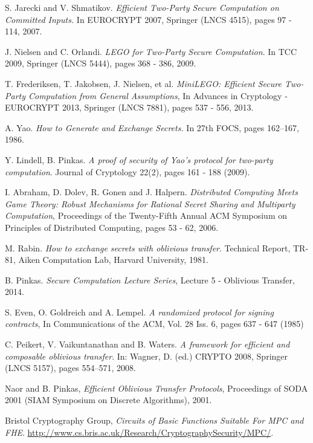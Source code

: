 \documentclass[ %
                    author={Nicholas Tutte},
                supervisor={Prof. Nigel Smart},
                    degree={MEng},
                     title={Secure Two Party Computation},
                  subtitle={A practical comparison of recent protocols},
                      type={Research - GG1K},
                      year={2015} ]{dissertation}
\begin{document}
\begin{thebibliography}{99}
			S. Jarecki and V. Shmatikov.
			\emph{Efficient Two-Party Secure Computation on Committed Inputs.}
			In EUROCRYPT 2007, Springer (LNCS 4515),
			pages 97 - 114,
			2007.

			J. Nielsen and C. Orlandi. \emph{LEGO for Two-Party Secure Computation}. In TCC 2009, Springer (LNCS 5444), pages 368 - 386, 2009.

			T. Frederiksen, T. Jakobsen, J. Nielsen, et al. \emph{MiniLEGO: Efficient Secure Two-Party Computation from General Assumptions}, In Advances in Cryptology - EUROCRYPT 2013, Springer (LNCS 7881), pages 537 - 556, 2013.

			A. Yao. \emph{How to Generate and Exchange Secrets.} In 27th FOCS, pages 162–167, 1986.

			Y. Lindell, B. Pinkas. \emph{A proof of security of Yao’s protocol for two-party computation}. Journal of Cryptology 22(2), pages 161 - 188 (2009).

			I. Abraham, D. Dolev, R. Gonen and J. Halpern. \emph{Distributed Computing Meets Game Theory: Robust Mechanisms for Rational Secret Sharing and Multiparty Computation}, Proceedings of the Twenty-Fifth Annual ACM Symposium on Principles of Distributed Computing,  pages 53 - 62, 2006.

			M. Rabin. \emph{How to exchange secrets with oblivious transfer}. Technical Report, TR-81, Aiken Computation Lab, Harvard University, 1981.

			B. Pinkas. \emph{Secure Computation Lecture Series}, Lecture 5 - Oblivious Transfer, 2014.

			S. Even, O. Goldreich and A. Lempel. \emph{A randomized protocol for signing contracts}, In Communications of the ACM, Vol. 28 Iss. 6, pages 637 - 647 (1985)

			C. Peikert, V. Vaikuntanathan and B. Waters. \emph{A framework for efficient and composable oblivious transfer}. In: Wagner, D. (ed.) CRYPTO 2008, Springer (LNCS 5157), pages 554–571, 2008.

			Naor and B. Pinkas, \emph{Efficient Oblivious Transfer Protocols}, Proceedings of SODA 2001 (SIAM Symposium on Discrete Algorithms), 2001.

			Bristol Cryptography Group,
			\emph{Circuits of Basic Functions Suitable For MPC and FHE}.  \url{http://www.cs.bris.ac.uk/Research/CryptographySecurity/MPC/}. 


\end{thebibliography}
\end{document}
